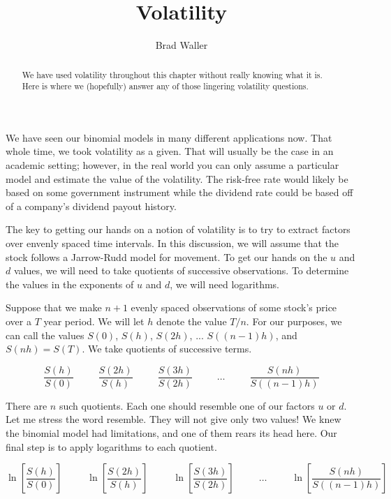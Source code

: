 \documentclass{ximera}
\author{Brad Waller}
\title{Volatility}
\begin{document}
\begin{abstract}
We have used volatility throughout this chapter without really knowing what it is. Here is where we (hopefully) answer any of those lingering volatility questions.
\end{abstract}

\maketitle

We have seen our binomial models in many different applications now. That whole time, we took volatility as a given. That will usually be the case in an academic setting; however, in the real world you can only assume a particular model and estimate the value of the volatility. The risk-free rate would likely be based on some government instrument while the dividend rate could be based off of a company's dividend payout history.

The key to getting our hands on a notion of volatility is to try to extract factors over envenly spaced time intervals. In this discussion, we will assume that the stock follows a Jarrow-Rudd model for movement. To get our hands on the $u$ and $d$ values, we will need to take quotients of successive observations. To determine the values in the exponents of $u$ and $d$, we will need logarithms.

Suppose that we make $n+1$  evenly spaced observations of some stock's price over a $T$ year period. We will let $h$ denote the value $T/n$. For our purposes, we can call the values $S(0)$, $S(h)$, $S(2h)$, ... $S((n-1)h)$, and $S(nh)=S(T)$. We take quotients of successive terms.

\begin{equation*}
\frac{S(h)}{S(0)} \hspace{30pt}\frac{S(2h)}{S(h)} \hspace{30pt} \frac{S(3h)}{S(2h)} \hspace{30pt} \dots \hspace{30pt} \frac{S(nh)}{S((n-1)h)}
\end{equation*}

There are $n$ such quotients. Each one should resemble one of our factors $u$ or $d$. Let me stress the word resemble. They will not give only two values! We knew the binomial model had limitations, and one of them rears its head here. Our final step is to apply logarithms to each quotient.

\begin{equation*}
\ln\left[\frac{S(h)}{S(0)}\right] \hspace{30pt}\ln\left[\frac{S(2h)}{S(h)}\right] \hspace{30pt} \ln\left[\frac{S(3h)}{S(2h)}\right] \hspace{30pt} \dots \hspace{30pt} \ln\left[\frac{S(nh)}{S((n-1)h)}\right]
\end{equation*}
\end{document}
